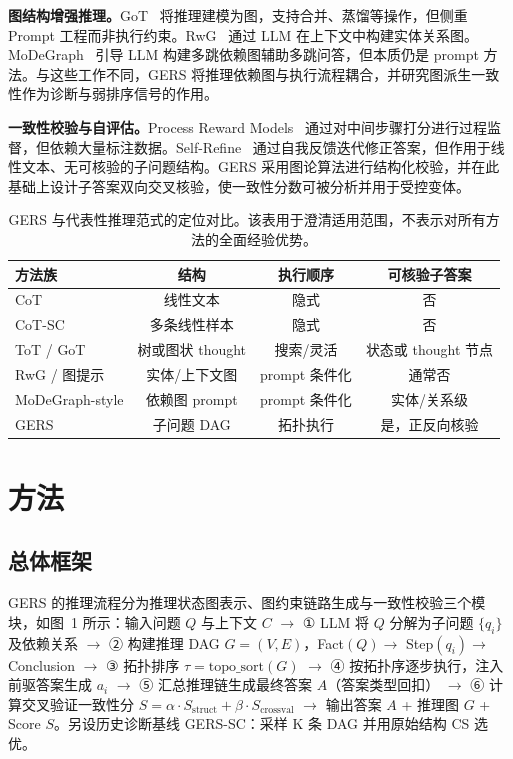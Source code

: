 \documentclass[11pt,a4paper]{ctexart}
\begin{document}
\noindent\textbf{图结构增强推理。}GoT~\cite{besta2024got} 将推理建模为图，支持合并、蒸馏等操作，但侧重 Prompt 工程而非执行约束。RwG~\cite{han2025rwg} 通过 LLM 在上下文中构建实体关系图。MoDeGraph~\cite{oruche2025modegraph} 引导 LLM 构建多跳依赖图辅助多跳问答，但本质仍是 prompt 方法。与这些工作不同，GERS 将推理依赖图与执行流程耦合，并研究图派生一致性作为诊断与弱排序信号的作用。

\noindent\textbf{一致性校验与自评估。}Process Reward Models~\cite{lightman2024verify} 通过对中间步骤打分进行过程监督，但依赖大量标注数据。Self-Refine~\cite{madaan2023selfrefine} 通过自我反馈迭代修正答案，但作用于线性文本、无可核验的子问题结构。GERS 采用图论算法进行结构化校验，并在此基础上设计子答案双向交叉核验，使一致性分数可被分析并用于受控变体。

\begin{table}[h]
\centering
\caption{GERS 与代表性推理范式的定位对比。该表用于澄清适用范围，不表示对所有方法的全面经验优势。}
\small
\begin{tabular}{lccc}
\toprule
方法族 & 结构 & 执行顺序 & 可核验子答案 \\
\midrule
CoT & 线性文本 & 隐式 & 否 \\
CoT-SC & 多条线性样本 & 隐式 & 否 \\
ToT / GoT & 树或图状 thought & 搜索/灵活 & 状态或 thought 节点 \\
RwG / 图提示 & 实体/上下文图 & prompt 条件化 & 通常否 \\
MoDeGraph-style & 依赖图 prompt & prompt 条件化 & 实体/关系级 \\
GERS & 子问题 DAG & 拓扑执行 & 是，正反向核验 \\
\bottomrule
\end{tabular}
\end{table}

\section{方法}

\subsection{总体框架}

GERS 的推理流程分为推理状态图表示、图约束链路生成与一致性校验三个模块，如图~1 所示：输入问题 $Q$ 与上下文 $C$ $\to$ ① LLM 将 $Q$ 分解为子问题 $\{q_i\}$ 及依赖关系 $\to$ ② 构建推理 DAG $G=(V,E)$，Fact$(Q) \to$ Step$(q_i) \to$ Conclusion $\to$ ③ 拓扑排序 $\tau = \text{topo\_sort}(G)$ $\to$ ④ 按拓扑序逐步执行，注入前驱答案生成 $a_i$ $\to$ ⑤ 汇总推理链生成最终答案 $A$（答案类型回扣） $\to$ ⑥ 计算交叉验证一致性分 $S = \alpha \cdot S_{\text{struct}} + \beta \cdot S_{\text{crossval}}$ $\to$ 输出答案 $A$ + 推理图 $G$ + Score $S$。另设历史诊断基线 GERS-SC：采样 K 条 DAG 并用原始结构 CS 选优。
\end{document}
